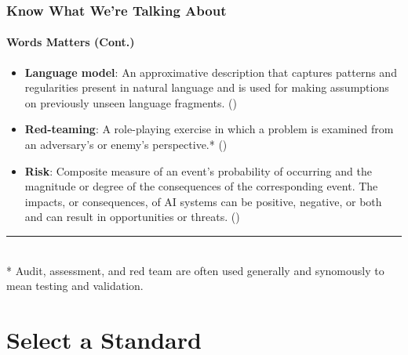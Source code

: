 \documentclass[11pt,
               aspectratio=169,
               hyperref={colorlinks}
               ]{beamer}
\begin{document}
		\begin{frame}
			
			\frametitle{Know What We're Talking About}
			\framesubtitle{Words Matters (Cont.)}
			
			\begin{itemize}
				
				\item \textbf{Language model}: An approximative description that captures patterns and regularities present in natural language and is used for making assumptions on previously unseen language fragments. (\cite{atherton2023language})

				\item \textbf{Red-teaming}: A role-playing exercise in which a problem is examined from an adversary’s or enemy’s perspective.* (\cite{atherton2023language})

				
				\item \textbf{Risk}: Composite measure of an event’s probability of occurring and the magnitude or degree of the consequences of the corresponding event. The impacts, or consequences, of AI systems can be positive, negative, or both and can result in opportunities or threats. (\cite{atherton2023language})

			\end{itemize}
			
			\vspace{10pt}
			\par\noindent\rule{100pt}{0.4pt}\\
			\vspace{5pt}
			\scriptsize{* Audit, assessment, and red team are often used generally and synomously to mean testing and validation.}
		
		\end{frame}



	\section{Select a Standard}
\end{document}
